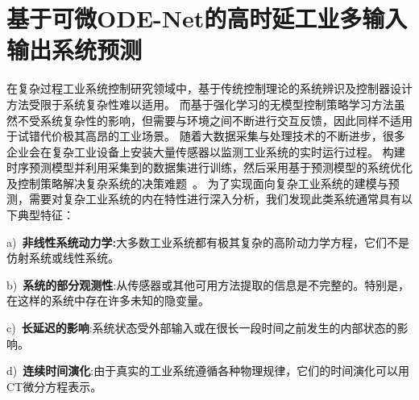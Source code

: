\renewcommand{\b}{\boldsymbol}

\chapter{基于可微ODE-Net的高时延工业多输入输出系统预测}
在复杂过程工业系统控制研究领域中，基于传统控制理论的系统辨识及控制器设计方法受限于系统复杂性难以适用。
而基于强化学习的无模型控制策略学习方法虽然不受系统复杂性的影响，但需要与环境之间不断进行交互反馈，因此同样不适用于试错代价极其高昂的工业场景。
随着大数据采集与处理技术的不断进步，很多企业会在复杂工业设备上安装大量传感器以监测工业系统的实时运行过程。
构建时序预测模型并利用采集到的数据集进行训练，然后采用基于预测模型的系统优化及控制策略解决复杂系统的决策难题~\cite{Yuan2020,Member2019,wu2020optimization}。
为了实现面向复杂工业系统的建模与预测，需要对复杂工业系统的内在特性进行深入分析，我们发现此类系统通常具有以下典型特征：

a)\ \textbf{非线性系统动力学:}大多数工业系统都有极其复杂的高阶动力学方程，它们不是仿射系统或线性系统。

b)\ \textbf{系统的部分观测性}:从传感器或其他可用方法提取的信息是不完整的。特别是，在这样的系统中存在许多未知的隐变量。

c)\ \textbf{长延迟的影响}:系统状态受外部输入或在很长一段时间之前发生的内部状态的影响。

d)\ \textbf{连续时间演化}:由于真实的工业系统遵循各种物理规律，它们的时间演化可以用CT微分方程表示。

